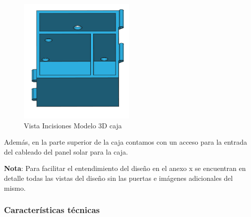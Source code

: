 \begin{figure}[H]
    \centering
    \includegraphics[width=0.5\textwidth]{images/4-DesarrolloTeorico/4-1-caja/CAJA_3D_ACCESOS.png}
    \caption{Vista Incisiones Modelo 3D caja}
    \label{fig:DesarrolloTeorico/Caja/CAJA_3D_ACCESOS}
\end{figure}


Además, en la parte superior de la caja contamos con un acceso para la entrada del cableado del panel solar para la caja.

\textbf{Nota}: Para facilitar el entendimiento del diseño en el anexo x se encuentran en detalle todas las vistas del diseño sin las puertas e imágenes adicionales del mismo. 

\subsubsection{Características técnicas}

